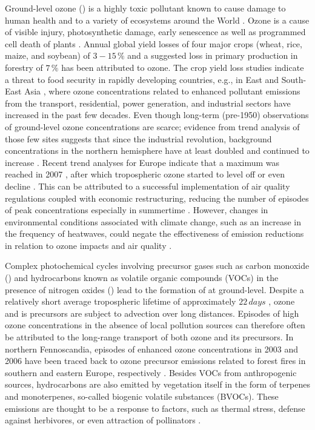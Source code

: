 \documentclass[bg, manuscript]{copernicus}
\begin{document}
Ground-level ozone () is a highly toxic pollutant known to cause damage to human health \citep{WHO2008} and to a variety of ecosystems around the World \citep{PT:Emberson2020}. Ozone is a cause of visible injury, photosynthetic damage, early senescence as well as programmed cell death of plants \citep{PCE:Kangasjarvi2005}. Annual global yield losses of four major crops (wheat, rice, maize, and soybean) of $3-15\,\unit{\%}$ \citep{PJ:Ainsworth2017} and a suggested loss in primary production in forestry of $7\,\unit{\%}$ \citep{GCB:Wittig2009,EP:Matyssek2012} has been attributed to ozone.
The crop yield loss studies indicate a threat to food security in rapidly developing countries, e.g., in East and South-East Asia \citep{GCB:Tang2013,NCC:Tai2014,AE:Chuwah2015,GCB:Mills2018}, where ozone concentrations related to enhanced pollutant emissions from the transport, residential, power generation, and industrial sectors have increased in the past few decades. Even though long-term (pre-1950) observations of ground-level ozone concentrations are scarce; evidence from trend analysis of those few sites suggests that since the industrial revolution, background concentrations in the northern hemisphere have at least doubled and continued to increase \citep[Chapter 2]{IPCC2013}. Recent trend analyses for Europe indicate that a maximum was reached in 2007 \citep{AE:Derwent2018}, after which tropospheric ozone started to level off or even decline \citep{ESA:Cooper2014, ACP:Wespes2018,ESA:Gaudel2018}. This can be attributed to a successful implementation of air quality regulations coupled with economic restructuring, reducing the number of episodes of peak concentrations especially in summertime \citep[e.g.,][]{ESA:Fleming2018, ESA:Mills2018}. However, changes in environmental conditions associated with climate change, such as an increase in the frequency of heatwaves, could negate the effectiveness of emission reductions in relation to ozone impacts and air quality \citep{NCC:Lin2020}.

Complex photochemical cycles involving precursor gases such as carbon monoxide () and hydrocarbons known as volatile organic compounds (VOCs) in the presence of nitrogen oxides () lead to the formation of  at ground-level. Despite a relatively short average tropospheric lifetime of approximately $22\,\unit{days}$ \citep{JGR:Stevenson2005,ACP:Young2013}, ozone and is precursors are subject to advection over long distances. Episodes of high ozone concentrations in the absence of local pollution sources can therefore often be attributed to the long-range transport of both ozone and its precursors. In northern Fennoscandia, episodes of enhanced ozone concentrations in 2003 and 2006 have been traced back to ozone precursor emissions related to forest fires in southern and eastern Europe, respectively \citep{AE:Lindskog2007,EP:Karlsson2013}. Besides VOCs from anthropogenic sources, hydrocarbons are also emitted by vegetation itself in the form of terpenes and monoterpenes, so-called biogenic volatile substances (BVOCs). These emissions are thought to be a response to factors, such as thermal stress, defense against herbivores, or even attraction of pollinators \citep{TPS:Penuelas2003}. 
\end{document}
